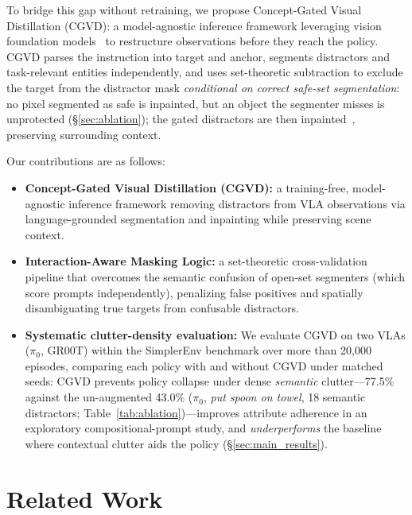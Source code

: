 \documentclass[letterpaper, 10 pt, conference]{ieeeconf}  %
\begin{document}
To bridge this gap without retraining, we propose Concept-Gated Visual Distillation (CGVD): a model-agnostic inference framework leveraging vision foundation models~\cite{sam3} to restructure observations before they reach the policy. CGVD parses the instruction into target and anchor, segments distractors and task-relevant entities independently, and uses set-theoretic subtraction to exclude the target from the distractor mask \emph{conditional on correct safe-set segmentation}: no pixel segmented as safe is inpainted, but an object the segmenter misses is unprotected (\S\ref{sec:ablation}); the gated distractors are then inpainted~\cite{lama}, preserving surrounding context.


Our contributions are as follows:
\begin{itemize}
    \item \textbf{Concept-Gated Visual Distillation (CGVD):} a training-free, model-agnostic inference framework removing distractors from VLA observations via language-grounded segmentation and inpainting while preserving scene context.

    \item \textbf{Interaction-Aware Masking Logic:} a set-theoretic cross-validation pipeline that overcomes the semantic confusion of open-set segmenters (which score prompts independently), penalizing false positives and spatially disambiguating true targets from confusable distractors.

    \item \textbf{Systematic clutter-density evaluation:}  We evaluate CGVD on two VLAs ($\pi_0$, GR00T) within the SimplerEnv benchmark over more than 20{,}000 episodes, comparing each policy with and without CGVD under matched seeds: CGVD prevents policy collapse under dense \emph{semantic} clutter---77.5\% against the un-augmented 43.0\% ($\pi_0$, \textit{put spoon on towel}, 18 semantic distractors; Table~\ref{tab:ablation})---improves attribute adherence in an exploratory compositional-prompt study, and \emph{underperforms} the baseline where contextual clutter aids the policy (\S\ref{sec:main_results}).
\end{itemize}



\section{Related Work}
\end{document}

